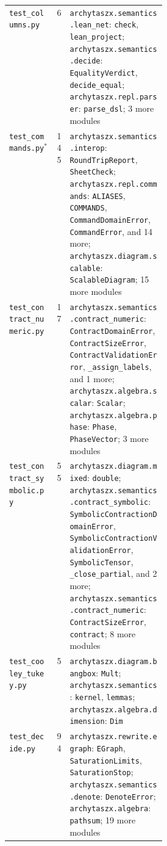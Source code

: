 \begin{xltabular}{\linewidth}{@{}>{\raggedright\arraybackslash}p{0.3\linewidth}r>{\raggedright\arraybackslash}X@{}}
\texttt{test\_\allowbreak{}columns.py} & 6 & \texttt{archytaszx.\allowbreak{}semantics.\allowbreak{}lean\_\allowbreak{}net}: \texttt{check}, \texttt{lean\_\allowbreak{}project}; \texttt{archytaszx.\allowbreak{}semantics.\allowbreak{}decide}: \texttt{EqualityVerdict}, \texttt{decide\_\allowbreak{}equal}; \texttt{archytaszx.\allowbreak{}repl.\allowbreak{}parser}: \texttt{parse\_\allowbreak{}dsl}; 3 more modules \\
\texttt{test\_\allowbreak{}commands.py}$^{\ast}$ & 145 & \texttt{archytaszx.\allowbreak{}semantics.\allowbreak{}interop}: \texttt{RoundTripReport}, \texttt{SheetCheck}; \texttt{archytaszx.\allowbreak{}repl.\allowbreak{}commands}: \texttt{ALIASES}, \texttt{COMMANDS}, \texttt{CommandDomainError}, \texttt{CommandError}, and 14 more; \texttt{archytaszx.\allowbreak{}diagram.\allowbreak{}scalable}: \texttt{ScalableDiagram}; 15 more modules \\
\texttt{test\_\allowbreak{}contract\_\allowbreak{}numeric.py} & 17 & \texttt{archytaszx.\allowbreak{}semantics.\allowbreak{}contract\_\allowbreak{}numeric}: \texttt{ContractDomainError}, \texttt{ContractSizeError}, \texttt{ContractValidationError}, \texttt{\_\allowbreak{}assign\_\allowbreak{}labels}, and 1 more; \texttt{archytaszx.\allowbreak{}algebra.\allowbreak{}scalar}: \texttt{Scalar}; \texttt{archytaszx.\allowbreak{}algebra.\allowbreak{}phase}: \texttt{Phase}, \texttt{PhaseVector}; 3 more modules \\
\texttt{test\_\allowbreak{}contract\_\allowbreak{}symbolic.py} & 55 & \texttt{archytaszx.\allowbreak{}diagram.\allowbreak{}mixed}: \texttt{double}; \texttt{archytaszx.\allowbreak{}semantics.\allowbreak{}contract\_\allowbreak{}symbolic}: \texttt{SymbolicContractionDomainError}, \texttt{SymbolicContractionValidationError}, \texttt{SymbolicTensor}, \texttt{\_\allowbreak{}close\_\allowbreak{}partial}, and 2 more; \texttt{archytaszx.\allowbreak{}semantics.\allowbreak{}contract\_\allowbreak{}numeric}: \texttt{ContractSizeError}, \texttt{contract}; 8 more modules \\
\texttt{test\_\allowbreak{}cooley\_\allowbreak{}tukey.py} & 5 & \texttt{archytaszx.\allowbreak{}diagram.\allowbreak{}bangbox}: \texttt{Mult}; \texttt{archytaszx.\allowbreak{}semantics}: \texttt{kernel}, \texttt{lemmas}; \texttt{archytaszx.\allowbreak{}algebra.\allowbreak{}dimension}: \texttt{Dim} \\
\texttt{test\_\allowbreak{}decide.py} & 94 & \texttt{archytaszx.\allowbreak{}rewrite.\allowbreak{}egraph}: \texttt{EGraph}, \texttt{SaturationLimits}, \texttt{SaturationStop}; \texttt{archytaszx.\allowbreak{}semantics.\allowbreak{}denote}: \texttt{DenoteError}; \texttt{archytaszx.\allowbreak{}algebra}: \texttt{pathsum}; 19 more modules \\

\end{xltabular}
